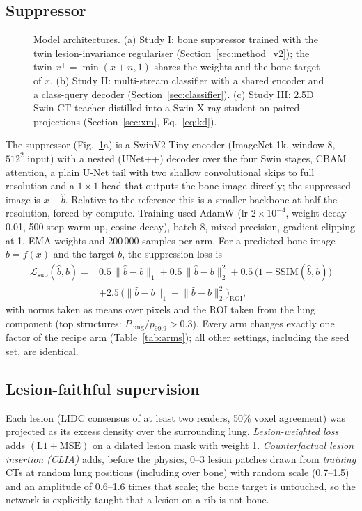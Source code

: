 \subsection{Suppressor}
\begin{figure}[htbp]
\centering
{}
\caption{Model architectures. (a) Study I: bone suppressor trained with the twin lesion-invariance regulariser (Section~\ref{sec:method_v2});
the twin $x^{+}=\min(x+n,1)$ shares the weights and the bone target of $x$. (b) Study II: multi-stream classifier with a shared encoder and a
class-query decoder (Section~\ref{sec:classifier}). (c) Study III: 2.5D Swin CT teacher distilled into a Swin X-ray student on paired
projections (Section~\ref{sec:xm}, Eq.~\eqref{eq:kd}).}
\label{fig:architecture}
\end{figure}
The suppressor (Fig.~\ref{fig:architecture}a) is a SwinV2-Tiny encoder (ImageNet-1k, window 8, $512^2$ input) with a nested (UNet++) decoder over the four Swin stages, CBAM attention, a plain
U-Net tail with two shallow convolutional skips to full resolution and a $1\times1$ head that outputs the bone image directly; the suppressed image is
$x-\hat b$. Relative to the reference this is a smaller backbone at half the resolution, forced by compute. Training used AdamW (lr $2\times10^{-4}$,
weight decay 0.01, 500-step warm-up, cosine decay), batch 8, mixed precision, gradient clipping at 1, EMA weights and 200\,000 samples per arm.
For a predicted bone image $\hat b=f(x)$ and the target $b$, the suppression loss is
\begin{equation}
\begin{split}
\mathcal{L}_{\mathrm{sup}}(\hat b,b)={}&0.5\,\lVert\hat b-b\rVert_1+0.5\,\lVert\hat b-b\rVert_2^2+0.5\,\big(1-\mathrm{SSIM}(\hat b,b)\big)\\
&+2.5\,\big(\lVert\hat b-b\rVert_1+\lVert\hat b-b\rVert_2^2\big)_{\mathrm{ROI}},
\end{split}
\label{eq:loss}
\end{equation}
with norms taken as means over pixels and the ROI taken from the lung component (top structures: $P_{\mathrm{lung}}/p_{99.9}>0.3$). Every arm changes exactly one factor of the recipe arm (Table~\ref{tab:arms}); all other settings,
including the seed set, are identical.

\subsection{Lesion-faithful supervision}
Each lesion (LIDC consensus of at least two readers, 50\% voxel agreement) was projected as its excess density over the surrounding lung.
\emph{Lesion-weighted loss} adds $(\mathrm{L1}+\mathrm{MSE})$ on a dilated lesion mask with weight 1. \emph{Counterfactual lesion insertion (CLIA)}
adds, before the physics, 0--3 lesion patches drawn from \emph{training} CTs at random lung positions (including over bone) with random scale
(0.7--1.5) and an amplitude of 0.6--1.6 times that scale; the bone target is untouched, so the network is explicitly taught that a lesion on a rib is not bone.

